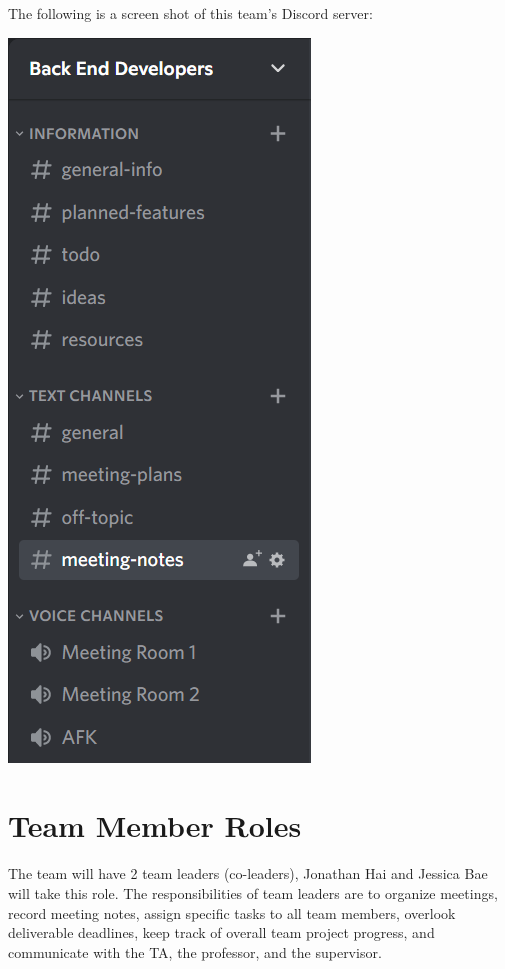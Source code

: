 \documentclass{article}
\begin{document}
The following is a screen shot of this team's Discord server:\\
\begin{center}
    \includegraphics{DiscordServer}
\end{center}

\section{Team Member Roles}
The team will have 2 team leaders (co-leaders), Jonathan Hai and Jessica Bae will take this role. The responsibilities of team leaders are to organize meetings, record meeting notes, assign specific tasks to all team members, overlook deliverable deadlines, keep track of overall team project progress, and communicate with the TA, the professor, and the supervisor.\\
\end{document}
